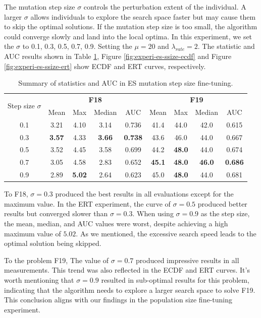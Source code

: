 \documentclass{article}
\begin{document}
The mutation step size $\sigma$ controls the perturbation extent of the individual. A larger $\sigma$ allows individuals to explore the search space faster but may cause them to skip the optimal solutions. If the mutation step size is too small, the algorithm could converge slowly and land into the local optima. In this experiment, we set the $\sigma$ to 0.1, 0.3, 0.5, 0.7, 0.9. Setting the $\mu = 20$ and $\lambda_{rate} = 2$. The statistic and AUC results shown in Table \ref{tab:experi-es-ssize}, Figure \ref{fig:experi-es-ssize-ecdf} and Figure \ref{fig:experi-es-ssize-ert} show ECDF and ERT curves, respectively.


\begin{table}[!ht]
    \centering
    \caption{Summary of statistics and AUC in ES mutation step size fine-tuning.}
    \label{tab:experi-es-ssize}
    \begin{tabular}{ccccccccc}
        \toprule
        \multirow{2}[3]{*}{Step size $\sigma$} &
        \multicolumn{4}{c}{\textbf{F18}} &
        \multicolumn{4}{c}{\textbf{F19}}\\
        \cmidrule(lr){2-5}
        \cmidrule(lr){6-9}
        & Mean & Max & Median & AUC & Mean & Max & Median & AUC\\
        \midrule
        0.1  & 3.21 & 4.10 & 3.14 & 0.736 & 41.4 & 44.0 & 42.0 & 0.615 \\
        0.3  & \textbf{3.57} & 4.33 & \textbf{3.66} & \textbf{0.738} & 43.6 & 46.0 & 44.0 & 0.667\\
        0.5  & 3.52 & 4.45 & 3.58 & 0.699 & 44.2 & \textbf{48.0} & 44.0 & 0.674\\
        0.7  & 3.05 & 4.58 & 2.83 & 0.652 & \textbf{45.1} & \textbf{48.0} & \textbf{46.0} & \textbf{0.686}\\
        0.9  & 2.89 & \textbf{5.02} & 2.64 & 0.623 & 45.0 & \textbf{48.0} & 44.0 & 0.681\\
        \bottomrule
    \end{tabular}
\end{table}

To F18, $\sigma=0.3$ produced the best results in all evaluations except for the maximum value. In the ERT experiment, the curve of $\sigma=0.5$ produced better results but converged slower than $\sigma=0.3$. When using $\sigma=0.9$ as the step size, the mean, median, and AUC values were worst, despite achieving a high maximum value of $5.02$. As we mentioned, the excessive search speed leads to the optimal solution being skipped. 

To the problem F19, The value of $\sigma=0.7$ produced impressive results in all measurements. This trend was also reflected in the ECDF and ERT curves. It's worth mentioning that $\sigma=0.9$ resulted in sub-optimal results for this problem, indicating that the algorithm needs to explore a larger search space to solve F19. This conclusion aligns with our findings in the population size fine-tuning experiment.
\end{document}
